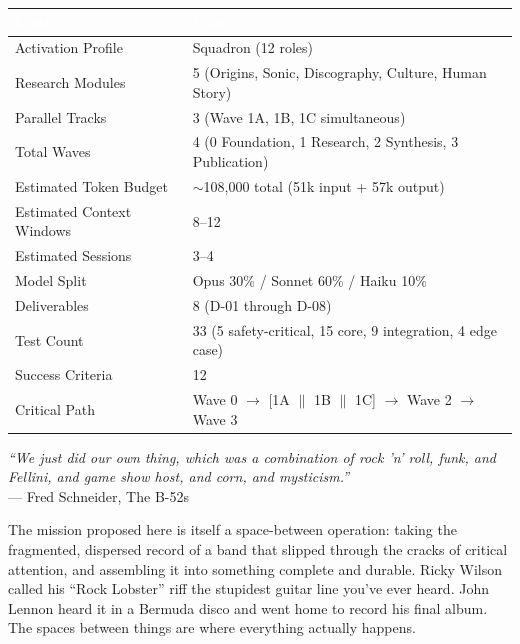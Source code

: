 \documentclass[11pt,letterpaper]{article}
\newcommand{\tableheader}[1]{\textbf{\sffamily\textcolor{white}{#1}}}
\begin{document}
\begin{center}
\begin{tabularx}{\textwidth}{L{4cm}X}
\toprule
{}
\tableheader{Metric} & \tableheader{Value} \\
\midrule
Activation Profile & Squadron (12 roles) \\
Research Modules & 5 (Origins, Sonic, Discography, Culture, Human Story) \\
Parallel Tracks & 3 (Wave 1A, 1B, 1C simultaneous) \\
Total Waves & 4 (0 Foundation, 1 Research, 2 Synthesis, 3 Publication) \\
Estimated Token Budget & $\sim$108,000 total (51k input + 57k output) \\
Estimated Context Windows & 8--12 \\
Estimated Sessions & 3--4 \\
Model Split & Opus 30\% / Sonnet 60\% / Haiku 10\% \\
Deliverables & 8 (D-01 through D-08) \\
Test Count & 33 (5 safety-critical, 15 core, 9 integration, 4 edge case) \\
Success Criteria & 12 \\
Critical Path & Wave 0 $\rightarrow$ [1A $\|$ 1B $\|$ 1C] $\rightarrow$ Wave 2 $\rightarrow$ Wave 3 \\
\bottomrule
\end{tabularx}
\end{center}

\vspace{2em}

\begin{quotebox}
\textit{``We just did our own thing, which was a combination of rock 'n' roll, funk, and Fellini, and game show host, and corn, and mysticism.''} \\[0.5em]
--- Fred Schneider, The B-52s

\vspace{0.8em}

The mission proposed here is itself a space-between operation: taking the fragmented, dispersed record of a band that slipped through the cracks of critical attention, and assembling it into something complete and durable. Ricky Wilson called his ``Rock Lobster'' riff the stupidest guitar line you've ever heard. John Lennon heard it in a Bermuda disco and went home to record his final album. The spaces between things are where everything actually happens.
\end{quotebox}
\end{document}

